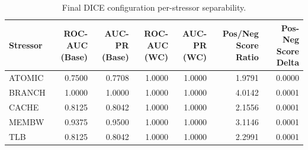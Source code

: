 \begin{table}[t]
\centering
\caption{Final DICE configuration per-stressor separability.}
\label{tab:dice_full_stressor}
\footnotesize
\begin{tabular}{lrrrrrr}
\toprule
Stressor & ROC-AUC (Base) & AUC-PR (Base) & ROC-AUC (WC) & AUC-PR (WC) & Pos/Neg Score Ratio & Pos-Neg Score Delta \\
\midrule
ATOMIC & 0.7500 & 0.7708 & 1.0000 & 1.0000 & 1.9791 & 0.0000 \\
BRANCH & 1.0000 & 1.0000 & 1.0000 & 1.0000 & 4.0142 & 0.0001 \\
CACHE & 0.8125 & 0.8042 & 1.0000 & 1.0000 & 2.1556 & 0.0001 \\
MEMBW & 0.9375 & 0.9500 & 1.0000 & 1.0000 & 3.1146 & 0.0001 \\
TLB & 0.8125 & 0.8042 & 1.0000 & 1.0000 & 2.2991 & 0.0001 \\
\bottomrule
\end{tabular}

\end{table}
